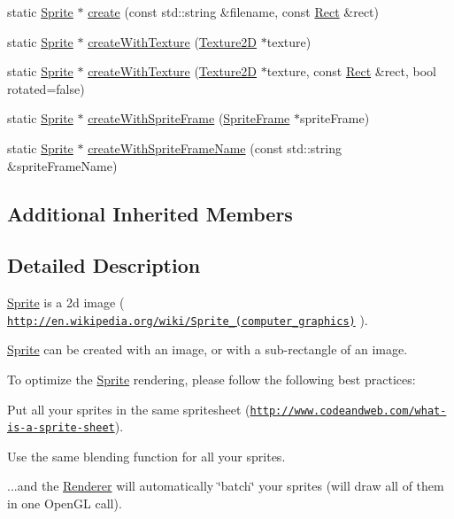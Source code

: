 \begin{DoxyCompactItemize}
\item 
static \hyperlink{classSprite}{Sprite} $\ast$ \hyperlink{classSprite_a5568c826d13031d153f6321c4bce1eca}{create} (const std\+::string \&filename, const \hyperlink{classRect}{Rect} \&rect)
\item 
static \hyperlink{classSprite}{Sprite} $\ast$ \hyperlink{classSprite_ab2116c7f8262d57b5e348077db263624}{create\+With\+Texture} (\hyperlink{classTexture2D}{Texture2D} $\ast$texture)
\item 
static \hyperlink{classSprite}{Sprite} $\ast$ \hyperlink{classSprite_a991657deed52a1dda260e0c1e42859e5}{create\+With\+Texture} (\hyperlink{classTexture2D}{Texture2D} $\ast$texture, const \hyperlink{classRect}{Rect} \&rect, bool rotated=false)
\item 
static \hyperlink{classSprite}{Sprite} $\ast$ \hyperlink{classSprite_a0f6b0927393d16cf576b04bd7d0eb851}{create\+With\+Sprite\+Frame} (\hyperlink{classSpriteFrame}{Sprite\+Frame} $\ast$sprite\+Frame)
\item 
static \hyperlink{classSprite}{Sprite} $\ast$ \hyperlink{classSprite_a1cd88febe986767b53977952c7d572b8}{create\+With\+Sprite\+Frame\+Name} (const std\+::string \&sprite\+Frame\+Name)
\end{DoxyCompactItemize}
\subsection*{Additional Inherited Members}


\subsection{Detailed Description}
\hyperlink{classSprite}{Sprite} is a 2d image ( \href{http://en.wikipedia.org/wiki/Sprite_(computer_graphics)}{\tt http\+://en.\+wikipedia.\+org/wiki/\+Sprite\+\_\+(computer\+\_\+graphics)} ).

\hyperlink{classSprite}{Sprite} can be created with an image, or with a sub-\/rectangle of an image.

To optimize the \hyperlink{classSprite}{Sprite} rendering, please follow the following best practices\+:
\begin{DoxyItemize}
\item Put all your sprites in the same spritesheet (\href{http://www.codeandweb.com/what-is-a-sprite-sheet}{\tt http\+://www.\+codeandweb.\+com/what-\/is-\/a-\/sprite-\/sheet}).
\item Use the same blending function for all your sprites.
\item ...and the \hyperlink{classRenderer}{Renderer} will automatically \char`\"{}batch\char`\"{} your sprites (will draw all of them in one Open\+GL call).
\end{DoxyItemize}

